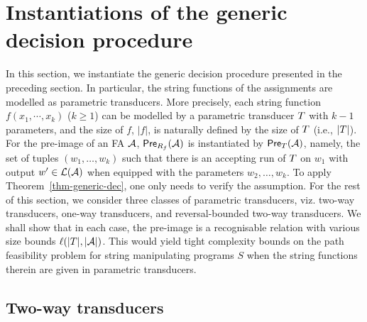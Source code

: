 
\section{Instantiations of the generic decision procedure}\label{sec-instan}

In this section, we instantiate the generic decision procedure presented in the preceding section. In particular, the string functions of the assignments are modelled as parametric transducers. More precisely, each string function $f(x_1, \cdots, x_k)$ ($k\geq 1$) can be modelled by a parametric transducer $T$  
with $k-1$ parameters, and the size of $f$, $|f|$, is naturally defined by the size of $T$ (i.e., $|T|$). For the pre-image of an FA $\mathcal{A}$,  $\textsf{Pre}_{R_f}(\mathcal{A})$ is instantiated by $\textsf{Pre}_{T}(\mathcal{A})$, namely, the set of tuples $(w_1,\ldots, w_k)$ such that there is an accepting run of $T$ on $w_1$ with output $w'\in \mathcal{L}(\mathcal{A})$ when equipped with the parameters $w_2,\ldots, w_k$. To apply Theorem~\ref{thm-generic-dec}, one only needs to verify the \prerec{} assumption. 
For the rest of this section, we consider three classes of parametric transducers, viz. two-way transducers, one-way transducers, and reversal-bounded two-way transducers. We shall show that in each case, the pre-image is a recognisable relation with various size bounds $\ell(|T|, |\mathcal{A}|)$. This would yield tight complexity bounds on the path feasibility problem for string manipulating programs $S$ when the string functions therein are given in parametric transducers.  



 
\subsection{Two-way transducers}\label{sec-2way}



